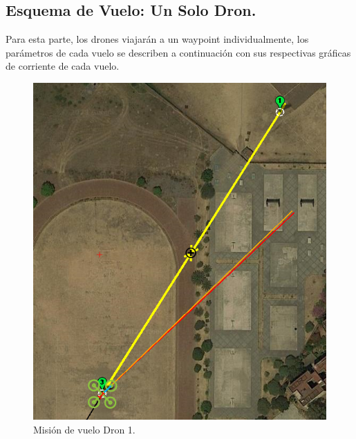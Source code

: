 \newpage

\subsection{Esquema de Vuelo: Un Solo Dron.}

Para esta parte, los drones viajarán a un waypoint individualmente, los parámetros de cada vuelo se describen a continuación con sus respectivas gráficas de corriente de cada vuelo.
\begin{figure}[h!]
    \begin{minipage}{0.3\linewidth}
        \centering
        \includegraphics[width=\linewidth]{imagenes/esq_2_1.png}
        \caption{Misión de vuelo Dron 1.}
        \label{fig:subfig1}
    \end{minipage}
    \hfill
    \begin{minipage}{0.3\linewidth}
        \centering

\end{minipage}
\end{figure}
